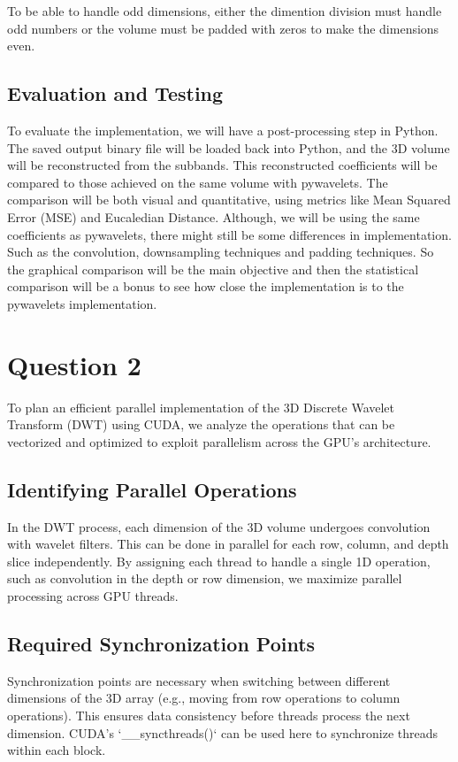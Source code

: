 \documentclass{article}
\begin{document}
To be able to handle odd dimensions, either the dimention division must handle odd numbers or the volume must be padded with zeros to make the dimensions even.\\

\subsection{Evaluation and Testing}
To evaluate the implementation, we will have a post-processing step in Python. The saved output binary file will be loaded back into Python, and the 3D volume will be reconstructed from the subbands. This reconstructed coefficients will be compared to those achieved on the same volume with pywavelets. The comparison will be both visual and quantitative, using metrics like Mean Squared Error (MSE) and Eucaledian Distance. Although, we will be using the same coefficients as pywavelets, there might still be some differences in implementation. Such as the convolution, downsampling techniques and padding techniques. So the graphical comparison will be the main objective and then the statistical comparison will be a bonus to see how close the implementation is to the pywavelets implementation.\\

\section{Question 2}
To plan an efficient parallel implementation of the 3D Discrete Wavelet Transform (DWT) using CUDA, we analyze the operations that can be vectorized and optimized to exploit parallelism across the GPU's architecture. 

\subsection{Identifying Parallel Operations}
In the DWT process, each dimension of the 3D volume undergoes convolution with wavelet filters. This can be done in parallel for each row, column, and depth slice independently. By assigning each thread to handle a single 1D operation, such as convolution in the depth or row dimension, we maximize parallel processing across GPU threads. 

\subsection{Required Synchronization Points}
Synchronization points are necessary when switching between different dimensions of the 3D array (e.g., moving from row operations to column operations). This ensures data consistency before threads process the next dimension. CUDA’s `__syncthreads()` can be used here to synchronize threads within each block.
\end{document}

